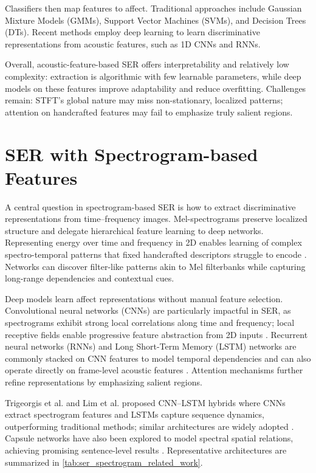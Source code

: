Classifiers then map features to affect. Traditional approaches include Gaussian Mixture Models (GMMs), Support Vector Machines (SVMs), and Decision Trees (DTs). Recent methods employ deep learning to learn discriminative representations from acoustic features, such as 1D CNNs and RNNs.

Overall, acoustic-feature-based SER offers interpretability and relatively low complexity: extraction is algorithmic with few learnable parameters, while deep models on these features improve adaptability and reduce overfitting. Challenges remain: STFT’s global nature may miss non-stationary, localized patterns; attention on handcrafted features may fail to emphasize truly salient regions.

\section{SER with Spectrogram-based Features}

A central question in spectrogram-based SER is how to extract discriminative representations from time–frequency images. Mel-spectrograms preserve localized structure and delegate hierarchical feature learning to deep networks. Representing energy over time and frequency in 2D enables learning of complex spectro-temporal patterns that fixed handcrafted descriptors struggle to encode \cite{nguyen2023wrist}. Networks can discover filter-like patterns akin to Mel filterbanks while capturing long-range dependencies and contextual cues.

Deep models learn affect representations without manual feature selection. Convolutional neural networks (CNNs) are particularly impactful in SER, as spectrograms exhibit strong local correlations along time and frequency; local receptive fields enable progressive feature abstraction from 2D inputs \cite{prakash2023novel}.
Recurrent neural networks (RNNs) and Long Short-Term Memory (LSTM) networks are commonly stacked on CNN features to model temporal dependencies and can also operate directly on frame-level acoustic features \cite{baruah2022speech}. Attention mechanisms \cite{vaswani2017attention} further refine representations by emphasizing salient regions.

Trigeorgis et al. \cite{trigeorgis2016adieu} and Lim et al. \cite{lim2016speech} proposed CNN–LSTM hybrids where CNNs extract spectrogram features and LSTMs capture sequence dynamics, outperforming traditional methods; similar architectures are widely adopted \cite{sarma2018emotion,trigeorgis2016adieu}. Capsule networks have also been explored to model spectral spatial relations, achieving promising sentence-level results \cite{wu2019speech}. Representative architectures are summarized in \ref{tab:ser_spectrogram_related_work}.


